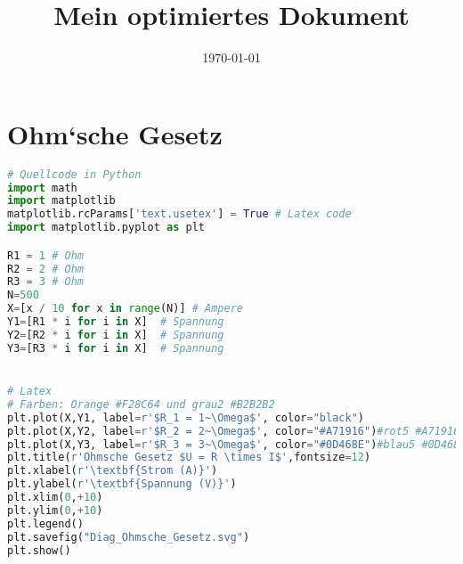 \documentclass[12pt,a4paper]{scrartcl}
\title{Mein optimiertes Dokument}
\date{\today}
\begin{document}
\maketitle

\hypertarget{ohmsche-gesetz}{%
\section{Ohm`sche Gesetz}\label{ohmsche-gesetz}}

\begin{lstlisting}[language=Python]
# Quellcode in Python
import math
import matplotlib 
matplotlib.rcParams['text.usetex'] = True # Latex code
import matplotlib.pyplot as plt 

R1 = 1 # Ohm
R2 = 2 # Ohm
R3 = 3 # Ohm
N=500 
X=[x / 10 for x in range(N)] # Ampere
Y1=[R1 * i for i in X]  # Spannung
Y2=[R2 * i for i in X]  # Spannung
Y3=[R3 * i for i in X]  # Spannung


# Latex
# Farben: Orange #F28C64 und grau2 #B2B2B2
plt.plot(X,Y1, label=r'$R_1 = 1~\Omega$', color="black")
plt.plot(X,Y2, label=r'$R_2 = 2~\Omega$', color="#A71916")#rot5 #A71916
plt.plot(X,Y3, label=r'$R_3 = 3~\Omega$', color="#0D468E")#blau5 #0D468E
plt.title(r'Ohmsche Gesetz $U = R \times I$',fontsize=12)
plt.xlabel(r'\textbf{Strom (A)}')
plt.ylabel(r'\textbf{Spannung (V)}')
plt.xlim(0,+10) 
plt.ylim(0,+10)
plt.legend()
plt.savefig("Diag_Ohmsche_Gesetz.svg")
plt.show()
\end{lstlisting}

\end{document}
